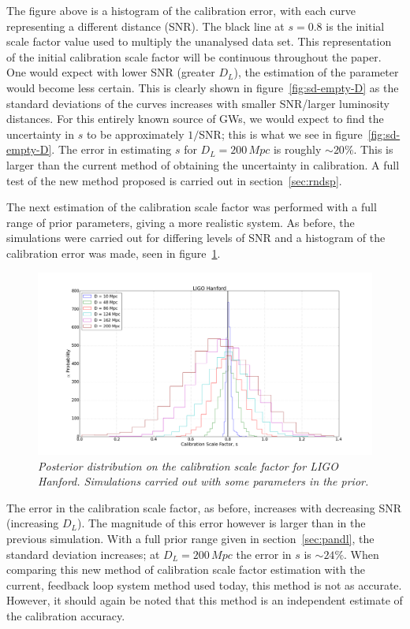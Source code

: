 \documentclass[12pt]{iopart}
\begin{document}
The figure above is a histogram of the calibration error, with each curve
representing a different distance (SNR). The black line at $s = 0.8$ is the
initial scale factor value used to multiply the unanalysed data set. This
representation of the initial calibration scale factor will be continuous
throughout the paper.  One would expect with lower SNR (greater $D_{L}$), the
estimation of the parameter would become less certain. This is clearly shown in
figure~\ref{fig:sd-empty-D} as the standard deviations of the curves increases
with smaller SNR/larger luminosity distances. For this entirely known source of
GWs, we would expect to find the uncertainty in $s$ to be approximately
$1/$SNR; this is what we see in figure~\ref{fig:sd-empty-D}. The error in
estimating $s$ for $D_{L} = 200 \,Mpc$ is roughly $\sim 20\%$. This is larger
than the current method of obtaining the uncertainty in calibration. A full
test of the new method proposed is carried out in section~\ref{sec:rndsp}.

The next estimation of the calibration scale factor was performed with a full
range of prior parameters, giving a more realistic system. As before, the
simulations were carried out for differing levels of SNR and a histogram of the
calibration error was made, seen in figure~\ref{fig:sd-non-empty-D}.

\begin{figure}
  \centering
  \includegraphics[width = \textwidth]{SD_non_empty_D10_200}
  \caption{\textit{Posterior distribution on the calibration scale factor for
LIGO Hanford. Simulations carried out with some parameters in the prior.}}
  \label{fig:sd-non-empty-D}
\end{figure}

The error in the calibration scale factor, as before, increases with decreasing
SNR (increasing $D_{L}$). The magnitude of this error however is larger than in
the previous simulation. With a full prior range given in
section~\ref{sec:pandl}, the standard deviation increases; at $D_{L} =
200\,Mpc$ the error in $s$ is $\sim 24\%$. When comparing this new method of
calibration scale factor estimation with the current, feedback loop system
method used today, this method is not as accurate. However, it should again be
noted that this method is an independent estimate of the calibration accuracy.
\end{document}
